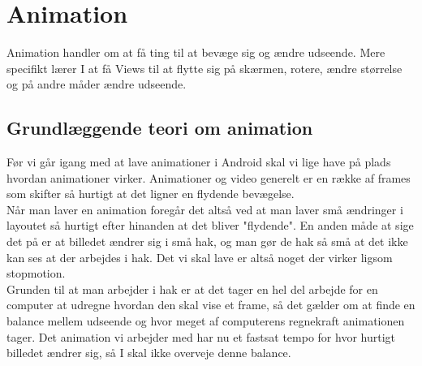 
\chapter{Animation}
Animation handler om at få ting til at bevæge sig og ændre udseende. Mere specifikt lærer I at få Views til at flytte sig på skærmen, rotere, ændre størrelse og på andre måder ændre udseende.
\section{Grundlæggende teori om animation}
Før vi går igang med at lave animationer i Android skal vi lige have på plads hvordan animationer virker.
Animationer og video generelt er en række af \gls{frame}s som skifter så hurtigt at det ligner en flydende bevægelse. \\
Når man laver en animation foregår det altså ved at man laver små ændringer i layoutet så hurtigt efter hinanden at det bliver "flydende". En anden måde at sige det på er at billedet ændrer sig i små hak, og man gør de hak så små at det ikke kan ses at der arbejdes i hak. Det vi skal lave er altså noget der virker ligsom stopmotion. \\
Grunden til at man arbejder i hak er at det tager en hel del arbejde for en computer  at udregne hvordan den skal vise et frame, så det gælder om at finde en balance mellem udseende og hvor meget af computerens regnekraft animationen tager. Det animation vi arbejder med har nu et fastsat tempo for hvor hurtigt billedet ændrer sig, så I skal ikke overveje denne balance.
